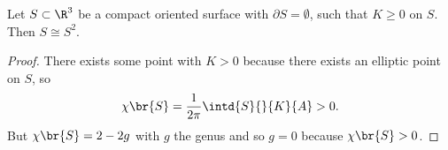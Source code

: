 \begin{corollary}
Let $ S \subset \R^3 $ be a compact oriented surface with $ \partial S = \emptyset $, such that $ K \ge 0 $ on $ S $. Then $ S \cong S^2 $.
\end{corollary}

\begin{proof}
There exists some point with $ K > 0 $ because there exists an elliptic point on $ S $, so
$$ \chi\br{S} = \dfrac{1}{2\pi}\intd{S}{}{K}{A} > 0. $$
But $ \chi\br{S} = 2 - 2g $ with $ g $ the genus and so $ g = 0 $ because $ \chi\br{S} > 0 $.
\end{proof}

